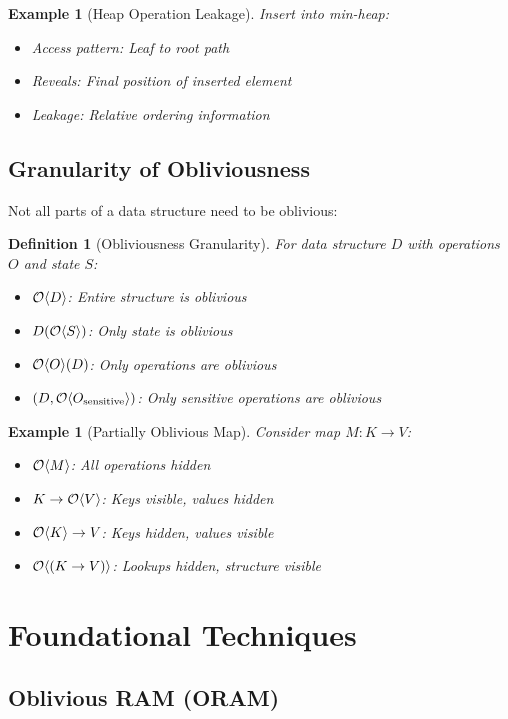 \documentclass[11pt,final,hidelinks]{article}
\newtheorem{definition}[theorem]{Definition}
\newtheorem{example}[theorem]{Example}
\begin{document}
\begin{example}[Heap Operation Leakage]
Insert into min-heap:
\begin{itemize}
    \item Access pattern: Leaf to root path
    \item Reveals: Final position of inserted element
    \item Leakage: Relative ordering information
\end{itemize}
\end{example}

\subsection{Granularity of Obliviousness}

Not all parts of a data structure need to be oblivious:

\begin{definition}[Obliviousness Granularity]
For data structure $D$ with operations $O$ and state $S$:
\begin{itemize}
    \item $\mathcal{O}\langle D \rangle$: Entire structure is oblivious
    \item $D(\mathcal{O}\langle S \rangle)$: Only state is oblivious
    \item $\mathcal{O}\langle O \rangle(D)$: Only operations are oblivious
    \item $(D, \mathcal{O}\langle O_{\text{sensitive}} \rangle)$: Only sensitive operations are oblivious
\end{itemize}
\end{definition}

\begin{example}[Partially Oblivious Map]
Consider map $M: K \to V$:
\begin{itemize}
    \item $\mathcal{O}\langle M \rangle$: All operations hidden
    \item $K \to \mathcal{O}\langle V \rangle$: Keys visible, values hidden
    \item $\mathcal{O}\langle K \rangle \to V$: Keys hidden, values visible
    \item $\mathcal{O}\langle (K \to V) \rangle$: Lookups hidden, structure visible
\end{itemize}
\end{example}

\section{Foundational Techniques}

\subsection{Oblivious RAM (ORAM)}
\end{document}
